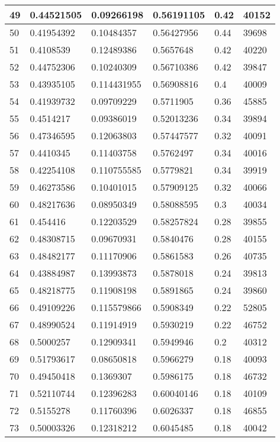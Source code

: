 \begin{longtable}{|l|l|l|l|l|l|}
49 & 0.44521505 & 0.09266198 & 0.56191105 & 0.42 & 40152 \\ \hline 
50 & 0.41954392 & 0.10484357 & 0.56427956 & 0.44 & 39698 \\ \hline 
51 & 0.4108539 & 0.12489386 & 0.5657648 & 0.42 & 40220 \\ \hline 
52 & 0.44752306 & 0.10240309 & 0.56710386 & 0.42 & 39847 \\ \hline 
53 & 0.43935105 & 0.114431955 & 0.56908816 & 0.4 & 40009 \\ \hline 
54 & 0.41939732 & 0.09709229 & 0.5711905 & 0.36 & 45885 \\ \hline 
55 & 0.4514217 & 0.09386019 & 0.52013236 & 0.34 & 39894 \\ \hline 
56 & 0.47346595 & 0.12063803 & 0.57447577 & 0.32 & 40091 \\ \hline 
57 & 0.4410345 & 0.11403758 & 0.5762497 & 0.34 & 40016 \\ \hline 
58 & 0.42254108 & 0.110755585 & 0.5779821 & 0.34 & 39919 \\ \hline 
59 & 0.46273586 & 0.10401015 & 0.57909125 & 0.32 & 40066 \\ \hline 
60 & 0.48217636 & 0.08950349 & 0.58088595 & 0.3 & 40034 \\ \hline 
61 & 0.454416 & 0.12203529 & 0.58257824 & 0.28 & 39855 \\ \hline 
62 & 0.48308715 & 0.09670931 & 0.5840476 & 0.28 & 40155 \\ \hline 
63 & 0.48482177 & 0.11170906 & 0.5861583 & 0.26 & 40735 \\ \hline 
64 & 0.43884987 & 0.13993873 & 0.5878018 & 0.24 & 39813 \\ \hline 
65 & 0.48218775 & 0.11908198 & 0.5891865 & 0.24 & 39860 \\ \hline 
66 & 0.49109226 & 0.115579866 & 0.5908349 & 0.22 & 52805 \\ \hline 
67 & 0.48990524 & 0.11914919 & 0.5930219 & 0.22 & 46752 \\ \hline 
68 & 0.5000257 & 0.12909341 & 0.5949946 & 0.2 & 40312 \\ \hline 
69 & 0.51793617 & 0.08650818 & 0.5966279 & 0.18 & 40093 \\ \hline 
70 & 0.49450418 & 0.1369307 & 0.5986175 & 0.18 & 46732 \\ \hline 
71 & 0.52110744 & 0.12396283 & 0.60040146 & 0.18 & 40109 \\ \hline 
72 & 0.5155278 & 0.11760396 & 0.6026337 & 0.18 & 46855 \\ \hline 
73 & 0.50003326 & 0.12318212 & 0.6045485 & 0.18 & 40042 \\ \hline 

\end{longtable}
